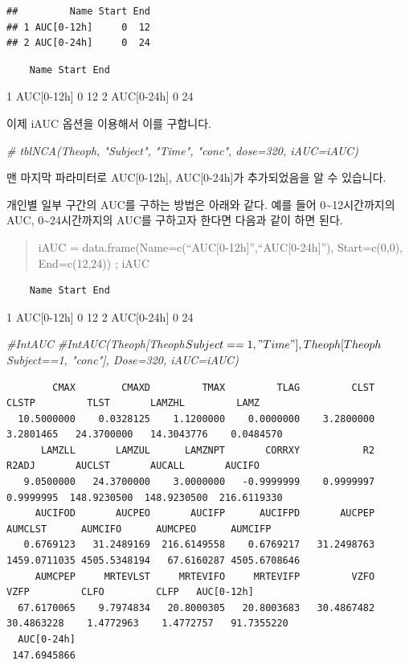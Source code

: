 \documentclass[12pt,]{krantz}
\newenvironment{Shaded}{\begin{snugshade}}{\end{snugshade}}
\newcommand{\CommentTok}[1]{\textcolor[rgb]{0.56,0.35,0.01}{\textit{#1}}}
\theoremstyle{definition}
\theoremstyle{definition}
\theoremstyle{definition}
\theoremstyle{remark}
\begin{document}
\begin{verbatim}
##         Name Start End
## 1 AUC[0-12h]     0  12
## 2 AUC[0-24h]     0  24
\end{verbatim}

\begin{verbatim}
    Name Start End
\end{verbatim}

1 AUC{[}0-12h{]} 0 12 2 AUC{[}0-24h{]} 0 24

이제 iAUC 옵션을 이용해서 이를 구합니다.

\begin{Shaded}
\begin{Highlighting}[]
\CommentTok{# tblNCA(Theoph, "Subject", "Time", "conc", dose=320, iAUC=iAUC)}
\end{Highlighting}
\end{Shaded}

맨 마지막 파라미터로 AUC{[}0-12h{]}, AUC{[}0-24h{]}가 추가되었음을 알 수
있습니다.

개인별 일부 구간의 AUC를 구하는 방법은 아래와 같다. 예를 들어
0\textasciitilde{}12시간까지의 AUC, 0\textasciitilde{}24시간까지의 AUC를
구하고자 한다면 다음과 같이 하면 된다.

\begin{quote}
iAUC = data.frame(Name=c(``AUC{[}0-12h{]}'',``AUC{[}0-24h{]}''),
Start=c(0,0), End=c(12,24)) ; iAUC
\end{quote}

\begin{verbatim}
    Name Start End
\end{verbatim}

1 AUC{[}0-12h{]} 0 12 2 AUC{[}0-24h{]} 0 24

\begin{Shaded}
\begin{Highlighting}[]
\CommentTok{#IntAUC}
\CommentTok{#IntAUC(Theoph[Theoph$Subject==1,"Time"], Theoph[Theoph$Subject==1, "conc"], Dose=320, iAUC=iAUC)}
\end{Highlighting}
\end{Shaded}

\begin{verbatim}
        CMAX        CMAXD         TMAX         TLAG         CLST        CLSTP         TLST       LAMZHL         LAMZ 
  10.5000000    0.0328125    1.1200000    0.0000000    3.2800000    3.2801465   24.3700000   14.3043776    0.0484570 
      LAMZLL       LAMZUL      LAMZNPT       CORRXY           R2        R2ADJ       AUCLST       AUCALL       AUCIFO 
   9.0500000   24.3700000    3.0000000   -0.9999999    0.9999997    0.9999995  148.9230500  148.9230500  216.6119330 
     AUCIFOD       AUCPEO       AUCIFP      AUCIFPD       AUCPEP      AUMCLST      AUMCIFO      AUMCPEO      AUMCIFP 
   0.6769123   31.2489169  216.6149558    0.6769217   31.2498763 1459.0711035 4505.5348194   67.6160287 4505.6708646 
     AUMCPEP     MRTEVLST     MRTEVIFO     MRTEVIFP         VZFO         VZFP         CLFO         CLFP   AUC[0-12h] 
  67.6170065    9.7974834   20.8000305   20.8003683   30.4867482   30.4863228    1.4772963    1.4772757   91.7355220 
  AUC[0-24h] 
 147.6945866 
\end{verbatim}
\end{document}
